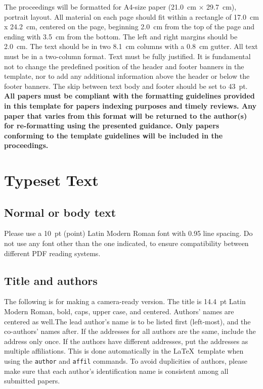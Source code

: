 \documentclass[non-peer-review]{fa2026}
\begin{document}
The proceedings will be formatted for
A4-size paper (\SI{21.0}{\centi\meter} $\times$ \SI{29.7}{\centi\meter}), portrait layout.
All material on each page should fit within a rectangle of \SI{17.0}{\centi\meter} x \SI{24.2}{\centi\meter},
centered on the page, beginning \SI{2.0}{\centi\meter}
from the top of the page and ending with \SI{3.5}{\centi\meter} from the bottom.
The left and right margins should be \SI{2.0}{\centi\meter}.
The text should be in two \SI{8.1}{\centi\meter} columns with a \SI{0.8}{\centi\meter} gutter.
All text must be in a two-column format. Text must be fully justified. It is fundamental not to change the predefined position of the header and footer banners in the template, nor to add any additional information above the header or below the footer banners. The skip between text body and footer should be set to \SI{43}{pt}.
\textbf{All papers must be compliant with the formatting guidelines provided in this template for papers indexing purposes and timely reviews. Any paper that varies from this format will be returned to the author(s) for re-formatting using the presented guidance. Only papers conforming to the template guidelines will be included in the proceedings.}


\section{Typeset Text}\label{sec:typeset_text}

\subsection{Normal or body text}\label{subsec:body}

Please use a \SI{10}{pt} (point) Latin Modern Roman font with 0.95 line spacing. Do not use any font other than the one indicated, to ensure compatibility between different PDF reading systems.

\subsection{Title and authors}

The following is for making a camera-ready version.
The title is \SI{14.4}{pt} Latin Modern Roman, bold, caps, upper case, and centered.
Authors' names are centered as well.The lead author's name is to be listed first (left-most), and the co-authors' names after.
If the addresses for all authors are the same, include the address only once. If the authors have different addresses, put the addresses as multiple affiliations. This is done automatically in the \LaTeX\ template when using the \texttt{author} and \texttt{affil} commands.
To avoid duplicities of authors, please make sure that each author's identification name is consistent among all submitted papers.
\end{document}
